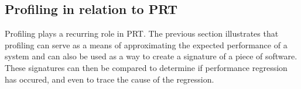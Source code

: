 \subsection{Profiling in relation to PRT}
Profiling plays a recurring role in PRT. The previous section illustrates that profiling can serve as a means of approximating the expected performance of a system \cite{profile_based_detection}\cite{performance_puzzles} and can also be used as a way to create a signature of a piece of software. These signatures can then be compared to determine if performance regression has occured, and even to trace the cause of the regression.



